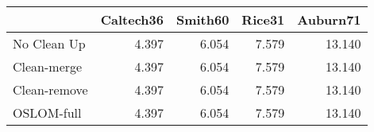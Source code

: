 \begin{tabular}{lrrrr}
\toprule
{} & Caltech36 & Smith60 & Rice31 & Auburn71 \\
\midrule
No Clean Up  &     4.397 &   6.054 &  7.579 &   13.140 \\
Clean-merge  &     4.397 &   6.054 &  7.579 &   13.140 \\
Clean-remove &     4.397 &   6.054 &  7.579 &   13.140 \\
OSLOM-full   &     4.397 &   6.054 &  7.579 &   13.140 \\
\bottomrule
\end{tabular}

